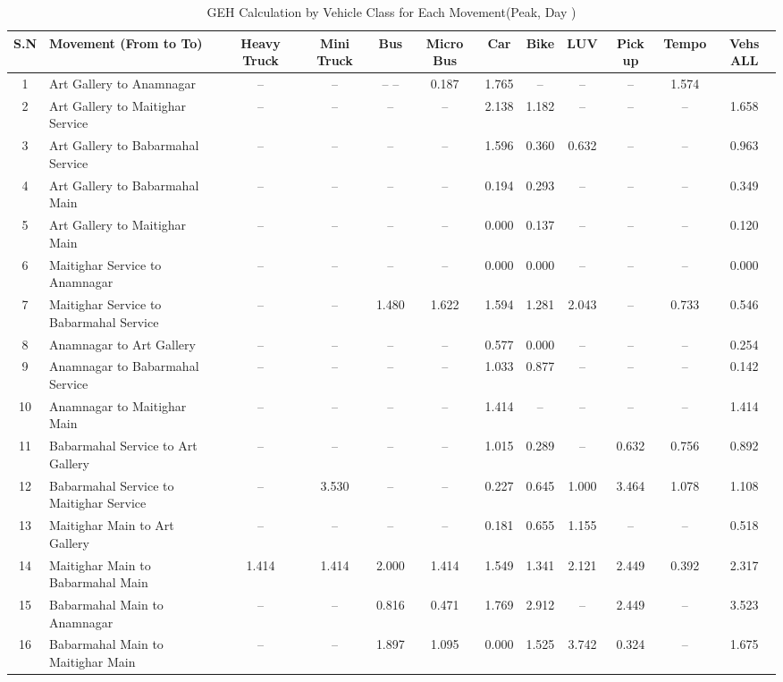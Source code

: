 \begin{landscape}
\begin{table}[h!]
\centering
\caption{GEH Calculation by Vehicle Class for Each Movement(Peak, Day )}
\small
\setlength{\tabcolsep}{5pt}
\begin{tabular}{|c|p{6cm}|c|c|c|c|c|c|c|c|c|c|}
\hline
S.N& Movement (From to To)& Heavy Truck & Mini Truck & Bus & Micro Bus & Car & Bike & LUV & Pick up & Tempo & Vehs ALL \\ \hline
1	&Art Gallery to Anamnagar	&–	&–	&–	–	&0.187	&1.765	&–	&–	&–	&1.574 \\ \hline
2	&Art Gallery to Maitighar Service	&–	&–	&–	&–	&2.138	&1.182	&–	&–	&–	&1.658 \\ \hline
3	&Art Gallery to Babarmahal Service	&–	&–	&–	&–	&1.596	&0.360	&0.632	&–	&–	&0.963 \\ \hline
4	&Art Gallery to Babarmahal Main	&–	&–	&–	&–	&0.194	&0.293	&–	&–	&–	&0.349 \\ \hline
5	&Art Gallery to Maitighar Main	&–	&–	&–	&–	&0.000	&0.137	&–	&–	&–	&0.120 \\ \hline
6	&Maitighar Service to Anamnagar	&–	&–	&–	&–	&0.000	&0.000	&–	&–	&–	&0.000 \\ \hline
7	&Maitighar Service to Babarmahal Service	&–	&–	&1.480	&1.622	&1.594	&1.281	&2.043	&–	&0.733	&0.546 \\ \hline
8	&Anamnagar to Art Gallery	&–	&–	&–	&–	&0.577	&0.000	&–	&–	&–	&0.254 \\ \hline
9	&Anamnagar to Babarmahal Service	&–	&–	&–	&–	&1.033	&0.877	&–	&–	&–	&0.142 \\ \hline
10	&Anamnagar to Maitighar Main	&–	&–	&–	&–	&1.414	&–	&–	&–	&–	&1.414 \\ \hline
11	&Babarmahal Service to Art Gallery	&–	&–	&–	&–	&1.015	&0.289	&–	&0.632	&0.756	&0.892 \\ \hline
12	&Babarmahal Service to Maitighar Service	&–	&3.530	&–	&–	&0.227	&0.645	&1.000	&3.464	&1.078	&1.108 \\ \hline
13	&Maitighar Main to Art Gallery	&–	&–	&–	&–	&0.181	&0.655	&1.155	&–	&–	&0.518 \\ \hline
14	&Maitighar Main to Babarmahal Main	&1.414	&1.414	&2.000	&1.414	&1.549	&1.341	&2.121	&2.449	&0.392	&2.317 \\ \hline
15	&Babarmahal Main to Anamnagar	&–	&–	&0.816	&0.471	&1.769	&2.912	&–	&2.449	&–	&3.523 \\ \hline
16	&Babarmahal Main to Maitighar Main	&–	&–	&1.897	&1.095	&0.000	&1.525	&3.742	&0.324	&–	&1.675 \\ \hline

\end{tabular}
\end{table}
\end{landscape}



